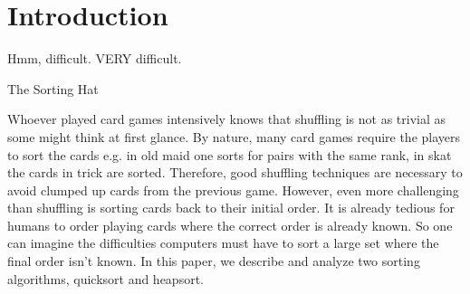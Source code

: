 \section{Introduction}
\vspace{2cm}
\epigraph{Hmm, difficult. VERY difficult.}{The Sorting Hat}
Whoever played card games intensively knows that shuffling is not as trivial as some might think at first glance. By nature, many card games require the players to sort the cards e.g. in old maid one sorts for pairs with the same rank, in skat the cards in trick are sorted. Therefore, good shuffling techniques are necessary to avoid clumped up cards from the previous game. However, even more challenging than shuffling is sorting cards back to their initial order. It is already tedious for humans to order playing cards where the correct order is already known. So one can imagine the difficulties computers must have to sort a large set where the final order isn't known. In this paper, we describe and analyze two sorting algorithms, quicksort and heapsort.
